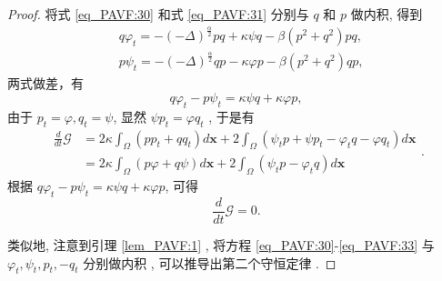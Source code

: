 \begin{proof}
	将式 \eqref{eq_PAVF:30} 和式 \eqref{eq_PAVF:31} 分别与 $q$ 和 $p$ 做内积, 得到
	\begin{equation}
	\begin{aligned}
	& q \varphi_t=-(-\Delta)^{\frac{\alpha}{2}} p q+\kappa \psi q-\beta\left(p^2+q^2\right) p q, \\
	& p \psi_t=-(-\Delta)^{\frac{\alpha}{2}} q p-\kappa \varphi p-\beta\left(p^2+q^2\right) q p,
	\end{aligned}
	\end{equation}
	两式做差，有
	\begin{equation}
	q \varphi_t-p \psi_t=\kappa \psi q+\kappa \varphi p,
	\end{equation}
	由于 $p_t=\varphi, q_t=\psi$, 显然 $\psi p_t=\varphi q_t$ , 于是有
	\begin{equation}
	\begin{aligned}
	\frac{d}{d t} \mathcal{G} & =2 \kappa \int_{\Omega}\left(p p_t+q q_t\right) d \boldsymbol{x}+2 \int_{\Omega}\left(\psi_t p+\psi p_t-\varphi_t q-\varphi q_t\right) d \boldsymbol{x} \\
	& =2 \kappa \int_{\Omega}(p \varphi+q \psi) d \boldsymbol{x}+2 \int_{\Omega}\left(\psi_t p-\varphi_t q\right) d \boldsymbol{x}
	\end{aligned}.
	\end{equation}
	根据 $q \varphi_t-p \psi_t=\kappa \psi q+\kappa \varphi p$, 可得
	\begin{equation}
	\frac{d}{d t} \mathcal{G}=0.
	\end{equation}

	类似地, 注意到引理 \ref{lem_PAVF:1} , 将方程 \eqref{eq_PAVF:30}-\eqref{eq_PAVF:33} 与 $\varphi_{t} , \psi_{t} , p_{t} , -q_{t}$ 分别做内积 , 可以推导出第二个守恒定律 . 
	
	\end{proof}

